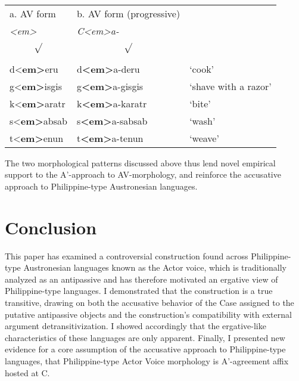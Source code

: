 \documentclass[10pt]{article}
\begin{document}
\begin{exe}
\begin{table}[h]
\hspace{+1cm}\begin{tabular}{lll} %
     a. AV form  & b. AV form (progressive) & \vspace{+1mm} 
     \\
    \hspace{+5mm}\textit{<em>\hspace{-1mm}\[
    \sqrt{\vphantom{^2}}
    \]} & \textit{C<em>a-\hspace{-1mm}\[
    \sqrt{\vphantom{^2}}
    \]} & \\\midrule
   d<\textbf{em>}eru  & d\textbf{<em>}a-deru  & `cook'               \\
     g<\textbf{em>}isgis  & g\textbf{<em>}a-gisgis  & `shave with a razor'  \\
      k<\textbf{em>}aratr  & k\textbf{<em>}a-karatr  & `bite'  \\
     s<\textbf{em>}absab  & s\textbf{<em>}a-sabsab  & `wash'  \\
      t<\textbf{em>}enun  & t\textbf{<em>}a-tenun  & `weave'  \\ \bottomrule 
\end{tabular}
\end{table}
\end{exe}

The two morphological patterns discussed above thus lend novel empirical support to the A'-approach to AV-morphology, and reinforce the accusative approach to Philippine-type Austronesian languages.

\section{Conclusion}

\noindent This paper has examined a controversial construction found across Philippine-type Austronesian languages known as the Actor voice, which is traditionally analyzed as an antipassive and has therefore motivated an ergative view of Philippine-type languages. I demonstrated that the construction is a true transitive, drawing on both the accusative behavior of the Case assigned to the putative antipassive objects and the construction's compatibility with external argument detransitivization. I showed accordingly that the ergative-like characteristics of these languages are only apparent. Finally, I presented new evidence for a core assumption of the accusative approach to Philippine-type languages, that Philippine-type Actor Voice morphology is A'-agreement affix hosted at C.



\nocite{*} %
\end{document}

